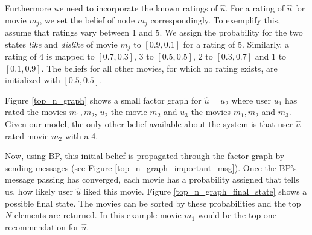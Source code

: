 Furthermore we need to incorporate the known ratings of $\hat u$. For a rating of $\hat u$ for movie $m_j$, we set the belief of node $m_j$ correspondingly. To exemplify this, assume that ratings vary between 1 and 5. We assign the probability for the two states \textit{like} and \textit{dislike} of movie $m_j$ to $[0.9,0.1]$ for a rating of 5. Similarly, a rating of 4 is mapped to $[0.7,0.3]$, 3 to $[0.5,0.5]$, 2 to $[0.3,0.7]$ and 1 to $[0.1,0.9]$. The beliefs for all other movies, for which no rating exists, are initialized with $[0.5,0.5]$.

Figure \ref{top_n_graph} shows a small factor graph for  $\hat u = u_2$ where user $u_1$ has rated the movies $m_1,m_2$, $u_2$ the movie $m_2$ and $u_3$ the movies $m_1,m_2$ and $m_3$. Given our model, the only other belief available about the system is that user $\hat u$ rated movie $m_2$ with a 4.

Now, using BP, this initial belief is propagated through the factor graph by sending messages (see Figure \ref{top_n_graph_important_msg}). Once the BP's message passing has converged, each movie has a probability assigned that tells us, how likely user $\hat u$ liked this movie. Figure \ref{top_n_graph_final_state} shows a possible final state. The movies can be sorted by these probabilities and the top $N$ elements are returned. In this example movie $m_1$ would be the top-one recommendation for $\hat u$.

